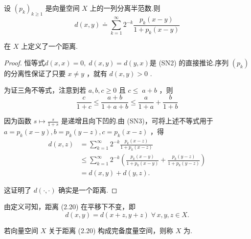 \begin{lemma}[由半范数生成的距离]
设 ${\left( {p}_{k}\right) }_{k \geq  1}$ 是向量空间 $X$ 上的一列分离半范数.则
\begin{equation}\tag{2.20}
d\left( {x,y}\right)  \doteq  \mathop{\sum }\limits_{{k = 1}}^{\infty }{2}^{-k}\frac{{p}_{k}\left( {x - y}\right) }{1 + {p}_{k}\left( {x - y}\right) }
\end{equation}

在 $X$ 上定义了一个距离.
\end{lemma}

\begin{proof}
恒等式$d\left( {x,x}\right)  = 0,\;d\left( {x,y}\right)  = d\left( {y,x}\right)$是 (SN2) 的直接推论.序列 $\left( {p}_{k}\right)$ 的分离性保证了只要 $x \neq  y$ ，就有 $d\left( {x,y}\right)  > 0$ .

为证三角不等式，注意到若 $a,b,c \geq  0$ 且 $c \leq \; a + b$ ，则
\[
\frac{c}{1 + c} \leq  \frac{a + b}{1 + a + b} \leq  \frac{a}{1 + a} + \frac{b}{1 + b}
\]

因为函数 $s \mapsto  \frac{s}{1 + s}$ 是递增且向下凹的.由 (SN3)，可将上述不等式用于 $a = {p}_{k}\left( {x - y}\right) ,b = {p}_{k}\left( {y - z}\right) ,c = {p}_{k}\left( {x - z}\right)$ ，得
{\setjot[-2]\begin{align*}
    d\left( {x,z}\right)  &= \mathop{\sum }\limits_{{k = 1}}^{\infty }{2}^{-k}\frac{{p}_{k}\left( {x - z}\right) }{1 + {p}_{k}\left( {x - z}\right) } \\
    &\leq  \mathop{\sum }\limits_{{k = 1}}^{\infty }{2}^{-k}\left( {\frac{{p}_{k}\left( {x - y}\right) }{1 + {p}_{k}\left( {x - y}\right) } + \frac{{p}_{k}\left( {y - z}\right) }{1 + {p}_{k}\left( {y - z}\right) }}\right) \\
    &= d\left( {x,y}\right)  + d\left( {y,z}\right) .
\end{align*}}


这证明了 $d\left( {\cdot , \cdot  }\right)$ 确实是一个距离.
\end{proof}

由定义可知，距离 (2.20) 在平移下不变，即
\[
d\left( {x,y}\right)  = d\left( {x + z,y + z}\right) \;\forall\,x,y,z \in  X.
\]

\begin{definition}[Fréchet空间]
    若向量空间 $X$ 关于距离 (2.20) 构成完备度量空间，则称 $X$ 为.
\end{definition}

